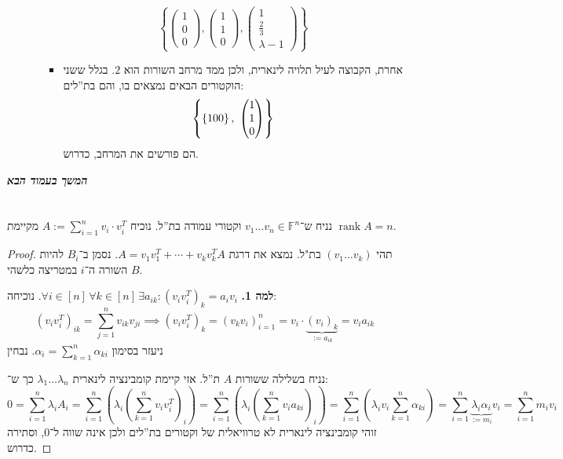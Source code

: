 \documentclass[]{article}
\newcommand\npage {\vfil {\hfil \textbf{\textit{המשך בעמוד הבא}}} \hfil \vfil \pagebreak}
\DeclareMathOperator{\rk}     {rank}
\newcommand\F         {\mathbb{F}}
\newcommand\co        {\colon}
\newcommand\pms[1]    {\begin{pmatrix}
        #1
\end{pmatrix}}
\newcommand\ag        {\alpha}
\renewcommand\lg      {\lambda}
\newcommand\cl [1]    {\left ( #1 \right )}
\newcommand\ccb[1]    {\left \{ #1 \right \}}
\theoremstyle{definition}
\begin{document}
\begin{enumerate}
\begin{itemize}
\begin{itemize}
                 \[ \ccb{\pms{1 \\ 0 \\ 0}, \pms{1 \\ 1 \\ 0}, \pms{1 \\ \frac{2}{3} \\ \lg - 1}} \]
                 \item אחרת, הקבוצה לעיל תלויה לינארית, ולכן ממד מרחב השורות הוא $2$. בגלל ששני הוקטורים הבאים נמצאים בו, והם בת''לים: 
                 \[ \ccb{\ccb{1 \\ 0 \\ 0},\ \pms{1 \\ 1 \\ 0}} \]
                 הם פורשים את המרחב, כדרוש. 
             \end{itemize}
        \end{itemize}
    \end{enumerate}
    \npage
    \section{}
        נניח ש־$v_1 \dots v_n \in \F^n$ וקטורי עמודה בת''ל. נוכיח $A := \sum_{i = 1}^{n}v_i \cdot v_i^{T}$ מקיימת $\rk A = n$. 
    \begin{proof}
        תהי $(v_1 \dots v_k)$ בת"ל. נמצא את דרגת $A = v_1v_1^T + \cdots + v_kv_k^TA$. נסמן ב־$B_i$ להיות השורה ה־$i$ במטריצה כלשהי $B$. 
        
        \textbf{למה 1. }\textit{$\forall i \in [n]\,\forall k \in [n] \, \exists a_{ik} \co (v_iv_i^T)_k = a_i v_i $}. נוכיחה: 
        \[ (v_iv_i^T)_{ik} = \sum_{j = 1}^{n}v_{ik}v_{ji} \implies 
        (v_iv_i^T)_k = (v_k v_i)_{i = 1}^n = v_i \cdot \underbrace{(v_i)_k}_{:= a_{ik}} = v_i a_{ik} \]
        ניעזר בסימון $\ag_i = \sum_{k = 1}^{n}\ag_{ki}$. נבחין 
        
        נניח בשלילה ששורות $A$ ת''ל. אזי קיימת קומבינציה לינארית $\lg_1 \dots \lg_n$ כך ש־: 
        \[ 0 = \sum_{i = 1}^{n}\lg_i A_i = \sum_{i = 1}^{n}\cl{\lg_i \cl{\sum_{k = 1}^{n}v_iv_i^T}_i} = \sum_{i = 1}^{n}\cl{\lg_i \cl{\sum_{k = 1}^{n}v_ia_{ki}}_i} = \sum_{i = 1}^{n}\cl{\lg_i v_i \sum_{k = 1}^{n}\ag_{ki}} = \sum_{i = 1}^{n}\underbrace{\lg_i\ag_i}_{:= m_i} v_i = \sum_{i = 1}^{n}m_iv_i  \]
        זוהי קומבינציה לינארית לא טרוויאלית של וקטורים בת''לים ולכן אינה שווה ל־$0$, וסתירה כדרוש. 
    \end{proof}
    
\end{document}
